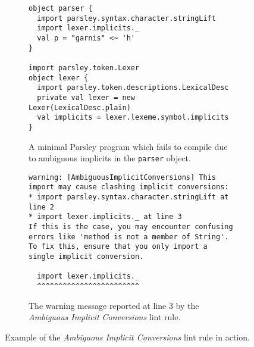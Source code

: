 \documentclass[../../main.tex]{subfiles}
\begin{document}
\begin{figure}[htbp]
\begin{subfigure}{\textwidth}
\begin{verbatim}
object parser {
  import parsley.syntax.character.stringLift
  import lexer.implicits._
  val p = "garnis" <~ 'h'
}

import parsley.token.Lexer
object lexer {
  import parsley.token.descriptions.LexicalDesc
  private val lexer = new Lexer(LexicalDesc.plain)
  val implicits = lexer.lexeme.symbol.implicits
}
\end{verbatim}
\caption{A minimal Parsley program which fails to compile due to ambiguous implicits in the \texttt{parser} object.}
\label{fig:ambiguous-implicits-example}
\end{subfigure}
%
\begin{subfigure}{\textwidth}
\vspace{3ex}
\begin{verbatim}
warning: [AmbiguousImplicitConversions] This import may cause clashing implicit conversions:
* import parsley.syntax.character.stringLift at line 2
* import lexer.implicits._ at line 3
If this is the case, you may encounter confusing errors like 'method is not a member of String'.
To fix this, ensure that you only import a single implicit conversion.

  import lexer.implicits._
  ^^^^^^^^^^^^^^^^^^^^^^^^  
\end{verbatim}
\caption{The warning message reported at line 3 by the \emph{Ambiguous Implicit Conversions} lint rule.}
\label{fig:ambiguous-implicits-warning}
\end{subfigure}
\caption{Example of the \emph{Ambiguous Implicit Conversions} lint rule in action.}
\end{figure}
\end{document}
